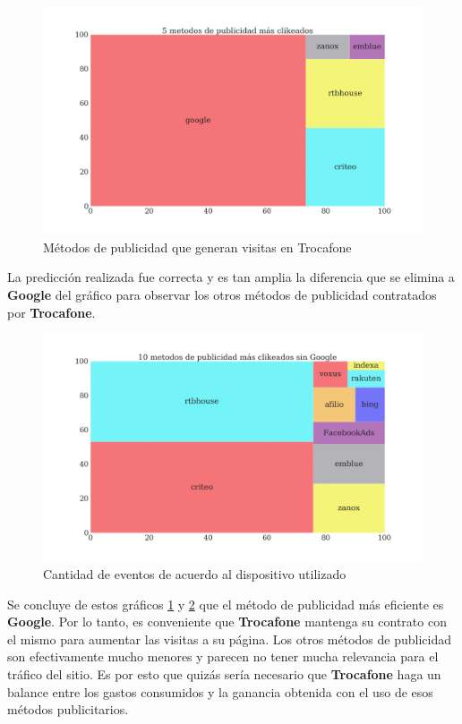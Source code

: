 \documentclass[a4paper]{article}
\begin{document}
\begin{figure}[h!]
	\includegraphics[width=\linewidth]{figures/170-publicidad_clickeada-barplot.png}
	\caption{Métodos de publicidad que generan visitas en Trocafone}
	\label{fig:metodopublicidad}
\end{figure}

La predicción realizada fue correcta y es tan amplia la diferencia que se elimina a \textbf{Google} del gráfico para observar los otros métodos de publicidad contratados por \textbf{Trocafone}.

\begin{figure}[h!]
	\includegraphics[width=\linewidth]{figures/171-publicidad_sin_google-barplot.png}
	\caption{Cantidad de eventos de acuerdo al dispositivo utilizado}
	\label{fig:metodopublicidadsingoogle}
\end{figure}

Se concluye de estos gráficos \ref{fig:metodopublicidad} y \ref{fig:metodopublicidadsingoogle} que el método de publicidad más eficiente es \textbf{Google}. Por lo tanto, es conveniente que \textbf{Trocafone} mantenga su contrato con el mismo para aumentar las visitas a su página. Los otros métodos de publicidad son efectivamente mucho menores y parecen no tener mucha relevancia para el tráfico del sitio. Es por esto que quizás sería necesario que \textbf{Trocafone} haga un balance entre los gastos consumidos y la ganancia obtenida con el uso de esos métodos publicitarios.
\end{document}
